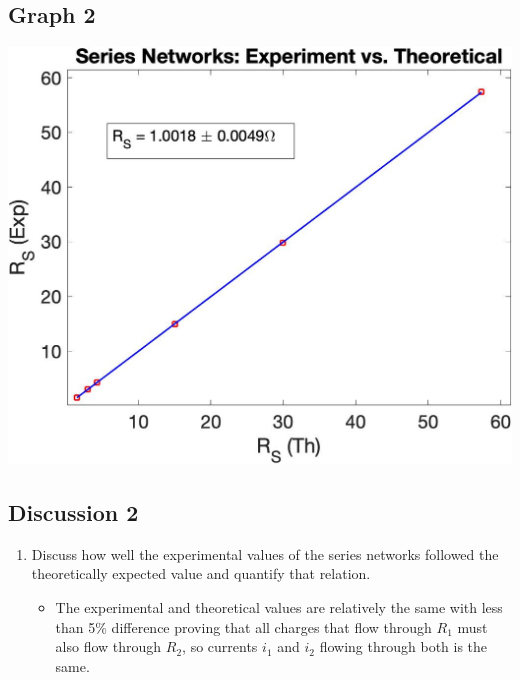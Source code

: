 \documentclass{article}
\begin{document}
\begin{table}[!htp]
\begin{center}
    \subsection*{Graph 2}
    \includegraphics[scale=0.18]{series.jpeg}
    \subsection*{Discussion 2}
    \begin{enumerate}
      \item Discuss how well the experimental values of the series networks followed the theoretically expected value and quantify that relation.
      \begin{itemize}
        \item The experimental and theoretical values are relatively the same with less than 5\% difference proving that all charges that flow through \(R_1\) must also flow through \(R_2\), so currents \(i_1\) and \(i_2\) flowing through both is the same.
      \end{itemize}
    \end{enumerate}
  \end{center}
\end{table}
\end{document}
